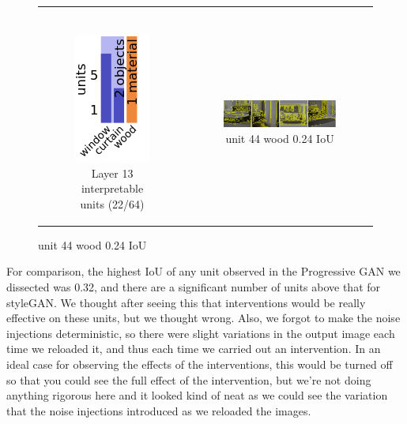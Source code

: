 \documentclass{article}
\begin{document}
\begin{figure}[h!]
\begin{tabular}{c c }
\begin{subfigure}[h!]{0.5\textwidth}
    \end{subfigure} \\
    \begin{subfigure}[h!]{0.6\textwidth}
        \caption{Layer 13 interpretable units (22/64)}
        \includegraphics[scale=0.4]{images/sg_layer13.png}
    \end{subfigure} & 
    \begin{subfigure}[h!]{0.5\textwidth}
        \caption{unit 44 wood 0.24 IoU}
        \includegraphics[scale=0.2]{images/sg_layer13_unit44_wood_0.24.png}
    \end{subfigure} \\
\end{tabular}
\end{figure}


For comparison, the highest IoU of any unit observed in the Progressive GAN we dissected was 0.32, and there are a significant number of units above that for styleGAN. We thought after seeing this that interventions would be really effective on these units, but we thought wrong. Also, we forgot to make the noise injections deterministic, so there were slight variations in the output image each time we reloaded it, and thus each time we carried out an intervention. In an ideal case for observing the effects of the interventions, this would be turned off so that you could see the full effect of the intervention, but we're not doing anything rigorous here and it looked kind of neat as we could see the variation that the noise injections introduced as we reloaded the images. 
\end{document}
